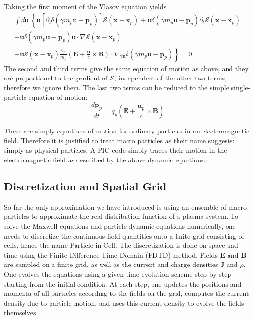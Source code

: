 Taking the first moment of the Vlasov equation yields
\begin{equation}
\begin{split}
    \int d\mathbf{u}\,\left\{ \mathbf{u}\left[ \partial_t \delta(\gamma m_{p}\mathbf{u} - \mathbf{p}_p) \right]\mathcal{S}(\mathbf{x} - \mathbf{x}_p) + \mathbf{u}\delta(\gamma m_{p}\mathbf{u} - \mathbf{p}_p)\partial_t\mathcal{S}(\mathbf{x} - \mathbf{x}_p) \right. \\
    + \mathbf{u}\delta(\gamma m_{p}\mathbf{u} - \mathbf{p}_p) \mathbf{u}\cdot\nabla \mathcal{S}(\mathbf{x} - \mathbf{x}_p) \\
    \left. + \mathbf{u}\mathcal{S}(\mathbf{x} - \mathbf{x}_p)\frac{q_p}{m_p}\left(\mathbf{E} + \frac{\mathbf{u}}{c}\times \mathbf{B}\right)\cdot \nabla_{\gamma \mathbf{u}}\delta(\gamma m_{p}\mathbf{u} - \mathbf{p}_p) \right\} = 0
\end{split}
\end{equation}
The second and third terms give the same equation of motion as above, and they
are proportional to the gradient of $\mathcal{S}$, independent of the other two terms,
therefore we ignore them. The last two terms can be reduced to the simple
single-particle equation of motion:
\begin{equation}
  \label{eq:eom-momentum}
\frac{d\mathbf{p}_p}{dt} = q_p\left(\mathbf{E} + \frac{\mathbf{u}_{p}}{c}\times \mathbf{B} \right)
\end{equation}

These are simply equations of motion for ordinary particles in an
electromagnetic field. Therefore it is justified to treat macro particles as
their name suggests: simply as physical particles. A PIC code simply traces their
motion in the electromagnetic field as described by the above dynamic equations.


\subsection{Discretization and Spatial Grid}
\label{sec:discretization}

So far the only approximation we have introduced is using an ensemble of macro
particles to approximate the real distribution function of a plasma system. To
solve the Maxwell equations and particle dynamic equations numerically, one
needs to discretize the continuous field quantities onto a finite grid
consisting of cells, hence the name Particle-in-Cell. The discretization is done
on space and time using the Finite Difference Time Domain (FDTD)
method. %
Fields $\mathbf{E}$ and $\mathbf{B}$ are sampled on a finite grid, as well as
the current and charge densities $\mathbf{J}$ and $\rho$. One evolves the
equations using a given time evolution scheme step by step starting from the
initial condition. At each step, one updates the positions and momenta of all
particles according to the fields on the grid, computes the current density due
to particle motion, and uses this current density to evolve the fields
themselves.

